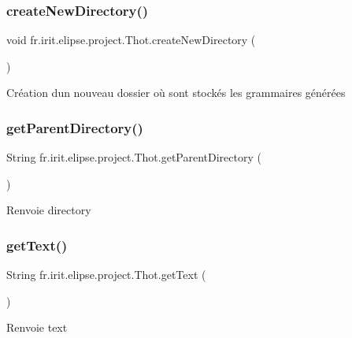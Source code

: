 \subsubsection{\texorpdfstring{createNewDirectory()}{createNewDirectory()}}
{\footnotesize\ttfamily void fr.\+irit.\+elipse.\+project.\+Thot.\+create\+New\+Directory (\begin{DoxyParamCaption}{ }\end{DoxyParamCaption})}

Création d\textquotesingle{}un nouveau dossier où sont stockés les grammaires générées\mbox{\label{classfr_1_1irit_1_1elipse_1_1project_1_1_thot_a31a0a5cb4843fb911fa998b1bb4998e7}} 
\subsubsection{\texorpdfstring{getParentDirectory()}{getParentDirectory()}}
{\footnotesize\ttfamily String fr.\+irit.\+elipse.\+project.\+Thot.\+get\+Parent\+Directory (\begin{DoxyParamCaption}{ }\end{DoxyParamCaption})}

\begin{DoxyReturn}{Renvoie}
directory
\end{DoxyReturn}
\mbox{\label{classfr_1_1irit_1_1elipse_1_1project_1_1_thot_acf8da72f08d81ea480817bbec8de3083}} 
\subsubsection{\texorpdfstring{getText()}{getText()}}
{\footnotesize\ttfamily String fr.\+irit.\+elipse.\+project.\+Thot.\+get\+Text (\begin{DoxyParamCaption}{ }\end{DoxyParamCaption})}

\begin{DoxyReturn}{Renvoie}
text
\end{DoxyReturn}
\mbox{\label{classfr_1_1irit_1_1elipse_1_1project_1_1_thot_ac49a3db580727813ecd301c504737b2d}} 
